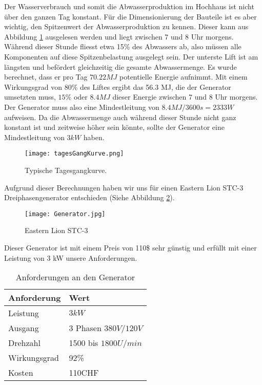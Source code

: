 Der Wasserverbrauch und somit die Abwasserproduktion im Hochhaus ist nicht über den ganzen Tag konstant. Für die Dimensionierung der Bauteile ist es aber wichtig, den Spitzenwert der Abwasserproduktion zu kennen. Dieser kann aus Abbildung \ref{fig:tagesGangKurve} ausgelesen werden und liegt zwischen 7 und 8 Uhr morgens. Während dieser Stunde fliesst etwa 15\% des Abwassers ab, also müssen alle Komponenten auf diese Spitzenbelastung ausgelegt sein. 
Der unterste Lift ist am längsten und befördert gleichzeitig die gesamte Abwassermenge. Es wurde berechnet, dass er pro Tag \(70.22 MJ\) potentielle Energie aufnimmt. Mit einem Wirkungsgrad von 80\% des Liftes ergibt das 56.3 MJ, die der Generator umsetzten muss, \(15\%\) oder \(8.4 MJ\) dieser Energie zwischen 7 und 8 Uhr morgens. Der Generator muss also eine Mindestleitung von \(8.4 MJ / 3600 s = 2333 W \) aufweisen. Da die Abwassermenge auch während dieser Stunde nicht ganz konstant ist und zeitweise höher sein könnte, sollte der Generator eine Mindestleitung von \(3 kW\) haben.

\begin{figure}[H]
\centering
\texttt{[image: tagesGangKurve.png]}
\caption{Typische Tagesgangkurve. \cite{peakWaterDemand}}
\label{fig:tagesGangKurve}
\end{figure}

Aufgrund dieser Berechnungen haben wir uns für einen Eastern Lion STC-3 Dreiphasengenerator entschieden (Siehe Abbildung \ref{fig:Generator}).  

\begin{figure}[H]
\centering
\texttt{[image: Generator.jpg]}
\caption{Eastern Lion STC-3 \cite{generator}}
\label{fig:Generator}
\end{figure}

Dieser Generator ist mit einem Preis von 110\$ sehr günstig und erfüllt mit einer Leistung von 3 kW unsere Anforderungen.
\begin{table}[H]
\small
\begin{center}
\begin{tabular}{ll}
\hline
\textbf{Anforderung}&\textbf{Wert}\\
\hline
Leistung&\(3kW\)\\
Ausgang&	3 Phasen \(380V/120V\)\\
Drehzahl&1500 bis \(1800 U/min\)\\
Wirkungsgrad&92\%\\
Kosten&110CHF\\
\end{tabular}
\caption{Anforderungen an den Generator}
\end{center}
\end{table}


